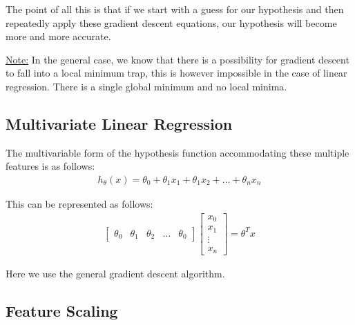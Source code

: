 \documentclass{article}
\begin{document}
        The point of all this is that if we start with a guess for our hypothesis and then repeatedly apply these gradient descent equations, 
        our hypothesis will become more and more accurate.
        \par
        \underline{Note:} In the general case, we know that there is a possibility for gradient descent to fall into a local minimum trap, this is however impossible in the
        case of linear regression. There is a single global minimum and no local minima.

        \newpage 

        \subsection{Multivariate Linear Regression}

        The multivariable form of the hypothesis function accommodating these multiple features is as follows:
        \begin{align*}
            h_{\theta}(x) = \theta_0 + \theta_1x_1 +  \theta_1x_2 + \ldots + \theta_nx_n
        \end{align*}

        This can be represented as follows:
        \begin{align*}
            \begin{bmatrix}
                \theta_0   & \theta_1 & \theta_2 & \dots & \theta_0
            \end{bmatrix}
            \begin{bmatrix}
                x_{0} \\
                x_{1} \\
                \vdots \\
                x_{n} 
            \end{bmatrix}  =  \theta^Tx
        \end{align*}

        Here we use the general gradient descent algorithm.

        \subsection{Feature Scaling}
\end{document}
